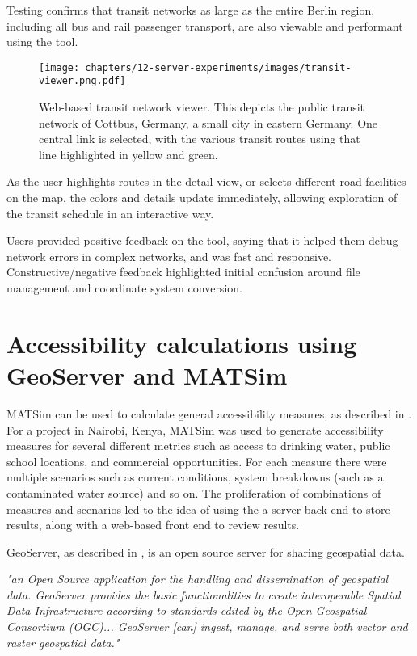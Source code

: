 Testing confirms that transit networks as large as the entire Berlin region, including all bus and rail passenger transport, are also viewable and performant using the tool.

\begin{figure}[!ht]
  \texttt{[image: chapters/12-server-experiments/images/transit-viewer.png.pdf]}
  \caption[Web-based transit network viewer]{Web-based transit network viewer. This depicts the public transit network of Cottbus, Germany, a small city in eastern Germany. One central link is selected, with the various transit routes using that line highlighted in yellow and green.}
  \label{fig:transit-viewer}
\end{figure}

As the user highlights routes in the detail view, or selects different road facilities on the map, the colors and details update immediately, allowing exploration of the transit schedule in an interactive way.

Users provided positive feedback on the tool, saying that it helped them debug network errors in complex networks, and was fast and responsive. Constructive/negative feedback highlighted initial confusion around file management and coordinate system conversion.

\hypertarget{server-experiments-geoserver}{%
\section{Accessibility calculations using GeoServer and MATSim}\label{server-experiments-geoserver}}

MATSim can be used to calculate general accessibility measures, as described in \cite{ziemke2018accessibility}. For a project in Nairobi, Kenya, MATSim was used to generate accessibility measures for several different metrics such as access to drinking water, public school locations, and commercial opportunities. For each measure there were multiple scenarios such as current conditions, system breakdowns (such as a contaminated water source) and so on. The proliferation of combinations of measures and scenarios led to the idea of using the a server back-end to store results, along with a web-based front end to review results.

\gls{GeoServer}, as described in \cite{giannecchini2013geoserver}, is an open source server for sharing geospatial data.

\begin{displayquote}
\emph{"an Open Source application for the handling and dissemination of geospatial data. GeoServer provides the basic functionalities to create interoperable Spatial Data Infrastructure according to standards edited by the Open Geospatial Consortium (OGC)... GeoServer [can] ingest, manage, and serve both vector and raster geospatial data."}
\end{displayquote}

